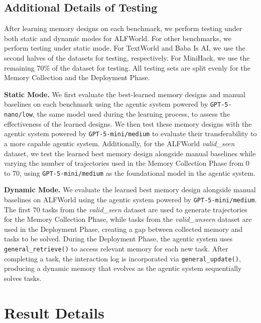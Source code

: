 \documentclass{article}
\theoremstyle{plain}
\theoremstyle{definition}
\theoremstyle{remark}
\begin{document}
\subsection{Additional Details of Testing}
\label{app:testing_details}
After learning memory designs on each benchmark, we perform testing under both static and dynamic modes for ALFWorld. For other benchmarks, we perform testing under static mode. For TextWorld and Baba Is AI, we use the second halves of the datasets for testing, respectively. For MiniHack, we use the remaining 70\% of the dataset for testing. All testing sets are split evenly for the Memory Collection and the Deployment Phase.

\noindent\textbf{Static Mode.}\hspace{0.5em} 
We first evaluate the best-learned memory designs and manual baselines on each benchmark using the agentic system powered by \texttt{GPT-5-nano/low}, the same model used during the learning process, to assess the effectiveness of the learned designs. 
We then test these memory designs with the agentic system powered by \texttt{GPT-5-mini/medium} to evaluate their transferability to a more capable agentic system. 
Additionally, for the ALFWorld \textit{valid\_seen} dataset, we test the learned best memory design alongside manual baselines while varying the number of trajectories used in the Memory Collection Phase from 0 to 70, using \texttt{GPT-5-mini/medium} as the foundational model in the agentic system.

\noindent\textbf{Dynamic Mode.}\hspace{0.5em} 
We evaluate the learned best memory design alongside manual baselines on ALFWorld using the agentic system powered by \texttt{GPT-5-mini/medium}. 
The first 70 tasks from the \textit{valid\_seen} dataset are used to generate trajectories for the Memory Collection Phase, 
while tasks from the \textit{valid\_unseen} dataset are used in the Deployment Phase, creating a gap between collected memory and tasks to be solved. 
During the Deployment Phase, the agentic system uses \texttt{general\_retrieve()} to access relevant memory for each new task. 
After completing a task, the interaction log is incorporated via \texttt{general\_update()}, producing a dynamic memory that evolves as the agentic system sequentially solves tasks.



\section{Result Details}
\end{document}
